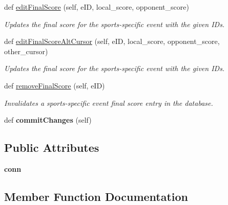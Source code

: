 \begin{DoxyCompactItemize}
def \hyperlink{classfinal__score__dao_1_1_final_score_d_a_o_a567b03d4681c90daadab71c5864c4b2d}{edit\+Final\+Score} (self, e\+ID, local\+\_\+score, opponent\+\_\+score)
\begin{DoxyCompactList}\small\item\em Updates the final score for the sports-\/specific event with the given I\+Ds. \end{DoxyCompactList}\item 
def \hyperlink{classfinal__score__dao_1_1_final_score_d_a_o_a599a27cd8531546734a34a0bbd266f3e}{edit\+Final\+Score\+Alt\+Cursor} (self, e\+ID, local\+\_\+score, opponent\+\_\+score, other\+\_\+cursor)
\begin{DoxyCompactList}\small\item\em Updates the final score for the sports-\/specific event with the given I\+Ds. \end{DoxyCompactList}\item 
def \hyperlink{classfinal__score__dao_1_1_final_score_d_a_o_ac615b6b55d71e6144b2527f1de67c36a}{remove\+Final\+Score} (self, e\+ID)
\begin{DoxyCompactList}\small\item\em Invalidates a sports-\/specific event final score entry in the database. \end{DoxyCompactList}\item 
\mbox{\label{classfinal__score__dao_1_1_final_score_d_a_o_a785312e3191bc39ab3ee22f2f1d319e4}} 
def {\bfseries commit\+Changes} (self)
\end{DoxyCompactItemize}
\subsection*{Public Attributes}
\begin{DoxyCompactItemize}
\item 
\mbox{\label{classfinal__score__dao_1_1_final_score_d_a_o_a4c86eb5b52ed52ddc7b2c0e5a09bb77c}} 
{\bfseries conn}
\end{DoxyCompactItemize}


\subsection{Member Function Documentation}
\mbox{\label{classfinal__score__dao_1_1_final_score_d_a_o_a7126025cd250de927c8b75186a150e0c}} 
